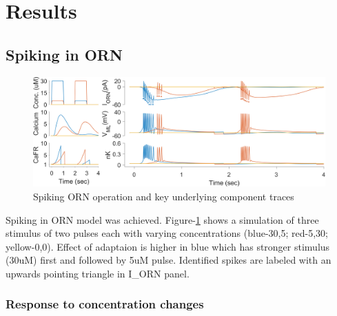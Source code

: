 \documentclass[
]{article}
\begin{document}
\hypertarget{results}{%
\section{Results}\label{results}}

\hypertarget{spiking-in-orn}{%
\subsection{Spiking in ORN}\label{spiking-in-orn}}

\begin{figure}

{\centering \includegraphics[width=0.9\linewidth]{figs/v1/fig_spk_all_components} 

}

\caption{Spiking ORN operation and key underlying component traces}\label{fig:rORN}
\end{figure}

Spiking in ORN model was achieved. Figure-\ref{fig:rORN} shows a simulation of three stimulus of two pulses each with varying concentrations (blue-30,5; red-5,30; yellow-0,0). Effect of adaptaion is higher in blue which has stronger stimulus (30uM) first and followed by 5uM pulse. Identified spikes are labeled with an upwards pointing triangle in I\_ORN panel.

\hypertarget{response-to-concentration-changes}{%
\subsubsection{Response to concentration changes}\label{response-to-concentration-changes}}
\end{document}
